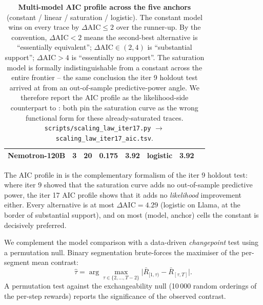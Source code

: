 \begin{table}[t]
\begin{tabular}{lrrrrrrl}
    Nemotron-120B         & 3 & 20 & 0.175 & 3.92 & logistic            & 3.92 \\
    \bottomrule
  \end{tabular}
  \caption{\textbf{Multi-model AIC profile across the five
    anchors} (constant / linear / saturation / logistic).
    The constant model wins on every trace by $\Delta\text{AIC}
    \le 2$ over the runner-up.  By the \citet{burnham2002model}
    convention, $\Delta\text{AIC} < 2$ means the second-best
    alternative is ``essentially equivalent''; $\Delta\text{AIC}
    \in (2, 4)$ is ``substantial support''; $\Delta\text{AIC} > 4$
    is ``essentially no support''.  The saturation model is
    formally indistinguishable from a constant across the entire
    frontier -- the same conclusion the iter 9 holdout test
    arrived at from an out-of-sample predictive-power angle.  We
    therefore report the AIC profile as the likelihood-side
    counterpart to : both pin the
    saturation curve as the wrong functional form for these
    already-saturated traces.
    \texttt{scripts/scaling\_law\_iter17.py} $\to$
    \texttt{scaling\_law\_iter17\_aic.tsv}.}
  \label{tab:scaling-iter17-aic}
\end{table}

The AIC profile in  is the
complementary formalism of the iter 9 holdout test: where
iter 9 showed that the saturation curve adds no out-of-sample
predictive power, the iter 17 AIC profile shows that it adds no
\emph{likelihood} improvement either.  Every alternative is at
most $\Delta\text{AIC} = 4.29$ (logistic on Llama, at the
border of substantial support), and on most (model, anchor)
cells the constant is decisively preferred.

We complement the model comparison with a data-driven
\emph{changepoint} test using a permutation null.  Binary
segmentation brute-forces the maximiser of the per-segment
mean contrast:
\begin{equation}
  \label{eq:changepoint}
  \hat\tau
    = \arg\max_{\tau \in \{2, \dots, T-2\}}
       \bigl|\bar R_{[1,\tau)} - \bar R_{[\tau,T]}\bigr|.
\end{equation}
A permutation test against the exchangeability null (10\,000
random orderings of the per-step rewards) reports the
significance of the observed contrast.

